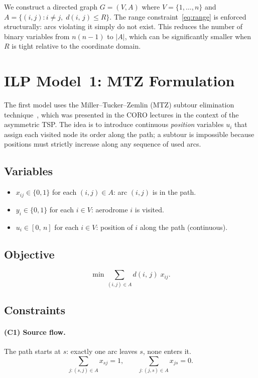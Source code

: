 \documentclass[12pt, a4paper]{article}
\newcommand{\dist}[2]{d(#1,\,#2)}
\begin{document}
We construct a directed graph $G = (V, A)$ where $V = \{1,\ldots,n\}$ and
$A = \{(i,j) : i \neq j,\;\dist{i}{j} \leq R\}$.
The range constraint~\eqref{eq:range} is enforced structurally: arcs violating it
simply do not exist. This reduces the number of binary variables from $n(n{-}1)$ to
$|A|$, which can be significantly smaller when $R$ is tight relative to the
coordinate domain.


\section{ILP Model~1: MTZ Formulation}

The first model uses the Miller--Tucker--Zemlin (MTZ) subtour elimination
technique~\cite{mtz}, which was presented in the CORO lectures in the context of
the asymmetric TSP. The idea is to introduce continuous \emph{position} variables
$u_i$ that assign each visited node its order along the path; a subtour is
impossible because positions must strictly increase along any sequence of used arcs.

\subsection{Variables}

\begin{itemize}[nosep]
  \item $x_{ij} \in \{0,1\}$ for each $(i,j) \in A$: arc $(i,j)$ is in the path.
  \item $y_i \in \{0,1\}$ for each $i \in V$: aerodrome $i$ is visited.
  \item $u_i \in [0,\,n]$ for each $i \in V$: position of $i$ along the path
        (continuous).
\end{itemize}

\subsection{Objective}

\[
  \min \sum_{(i,j) \in A} \dist{i}{j}\; x_{ij}.
\]

\subsection{Constraints}

\paragraph{(C1) Source flow.}
The path starts at $s$: exactly one arc leaves $s$, none enters it.
\[
  \sum_{j:(s,j)\in A} x_{sj} = 1, \qquad
  \sum_{j:(j,s)\in A} x_{js} = 0.
\]
\end{document}

